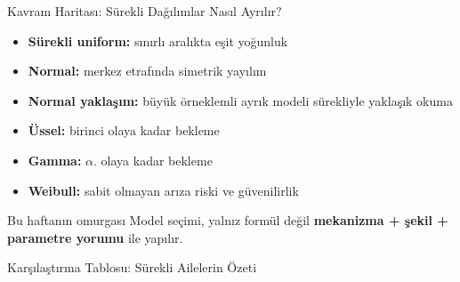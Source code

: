 \documentclass[light]{lutbeamer}
\begin{document}
\begin{frame}{Kavram Haritası: Sürekli Dağılımlar Nasıl Ayrılır?}
    \small
    \begin{itemize}
        \item \textbf{Sürekli uniform:} sınırlı aralıkta eşit yoğunluk
        \item \textbf{Normal:} merkez etrafında simetrik yayılım
        \item \textbf{Normal yaklaşım:} büyük örneklemli ayrık modeli sürekliyle yaklaşık okuma
        \item \textbf{Üssel:} birinci olaya kadar bekleme
        \item \textbf{Gamma:} \(\alpha\). olaya kadar bekleme
        \item \textbf{Weibull:} sabit olmayan arıza riski ve güvenilirlik
    \end{itemize}

    \begin{alertblock}{Bu haftanın omurgası}
        Model seçimi, yalnız formül değil \textbf{mekanizma + şekil + parametre yorumu} ile yapılır.
    \end{alertblock}
\end{frame}

\begin{frame}{Karşılaştırma Tablosu: Sürekli Ailelerin Özeti}
    \scriptsize
    \begin{center}
    \end{center}
\end{frame}
\end{document}
